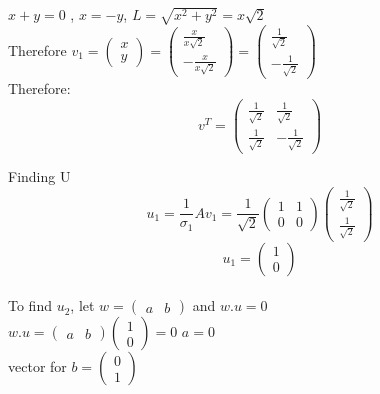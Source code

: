 \documentclass[12pt, oneside]{article}   	%
\begin{document}
\begin{enumerate}
	$x+y=0$ , $x=-y$, $L=\sqrt{x^2+y^2}= x\sqrt{2}$\\ 
	Therefore $v_1= \left( \begin{array}{c} x \\ y  \end{array} \right)=\left( \begin{array}{c} \frac{x}{x\sqrt{2}} \\ -\frac{x}{x\sqrt{2}} \end{array} \right) = \left( \begin{array}{c} \frac{1}{\sqrt{2}} \\ -\frac{1}{\sqrt{2}} \end{array} \right)$\\
	Therefore: $$v^T=\left( \begin{array}{cc} \frac{1}{\sqrt{2}}& \frac{1}{\sqrt{2}} \\  \frac{1}{\sqrt{2}} & -\frac{1}{\sqrt{2}}   \end{array} \right)$$
	
	Finding U
	$$u_1= \frac{1}{\sigma_1}Av_1= \frac{1}{\sqrt{2}}\left( \begin{array}{cc} 1&1 \\ 0& 0 \end{array} \right) \left( \begin{array}{c} \frac{1}{\sqrt{2}} \\ \frac{1}{\sqrt{2}}  \end{array} \right)$$
	$$u_1= \left( \begin{array}{c} 1 \\ 0 \end{array} \right)$$\\
	
	To find $u_2$, let $w=\left( \begin{array}{cc} a&b  \end{array} \right)$ and $w.u=0$\\
	
	$w.u=\left( \begin{array}{cc} a&b  \end{array} \right)\left( \begin{array}{c} 1\\0 \end{array} \right)=0$
	$a=0$\\
	vector for $b=\left( \begin{array}{c} 0\\1 \end{array} \right)$ \\
	

\end{enumerate}
\end{document}
